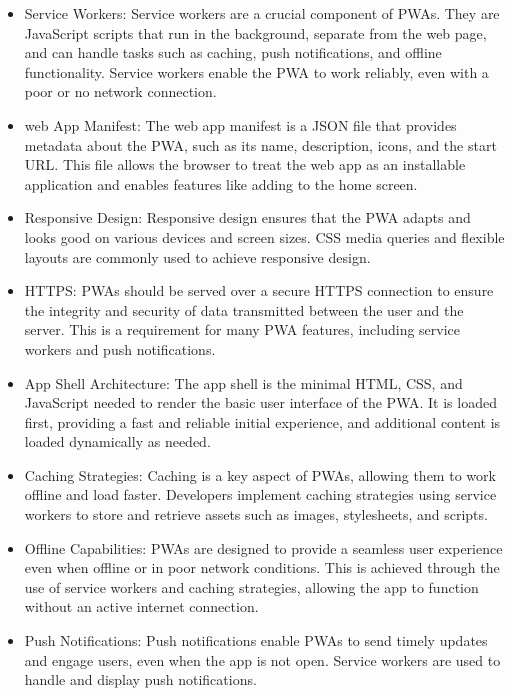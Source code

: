 \documentclass[12pt,a4paper, twosite]{article}
\begin{document}
\begin{itemize}
\item Service Workers:
  Service workers are a crucial component of PWAs. They are JavaScript scripts that run in the background, separate from the web page, and can handle tasks such as caching, push notifications, and offline functionality. Service workers enable the PWA to work reliably, even with a poor or no network connection.

\item web App Manifest:
  The web app manifest is a JSON file that provides metadata about the PWA, such as its name, description, icons, and the start URL. This file allows the browser to treat the web app as an installable application and enables features like adding to the home screen.

\item Responsive Design:
  Responsive design ensures that the PWA adapts and looks good on various devices and screen sizes. CSS media queries and flexible layouts are commonly used to achieve responsive design.

\item HTTPS:
  PWAs should be served over a secure HTTPS connection to ensure the integrity and security of data transmitted between the user and the server. This is a requirement for many PWA features, including service workers and push notifications.

\item App Shell Architecture:
  The app shell is the minimal HTML, CSS, and JavaScript needed to render the basic user interface of the PWA. It is loaded first, providing a fast and reliable initial experience, and additional content is loaded dynamically as needed.

\item Caching Strategies:
  Caching is a key aspect of PWAs, allowing them to work offline and load faster. Developers implement caching strategies using service workers to store and retrieve assets such as images, stylesheets, and scripts.

\item Offline Capabilities:
  PWAs are designed to provide a seamless user experience even when offline or in poor network conditions. This is achieved through the use of service workers and caching strategies, allowing the app to function without an active internet connection.

\item Push Notifications:
  Push notifications enable PWAs to send timely updates and engage users, even when the app is not open. Service workers are used to handle and display push notifications.


\end{itemize}
\end{document}
